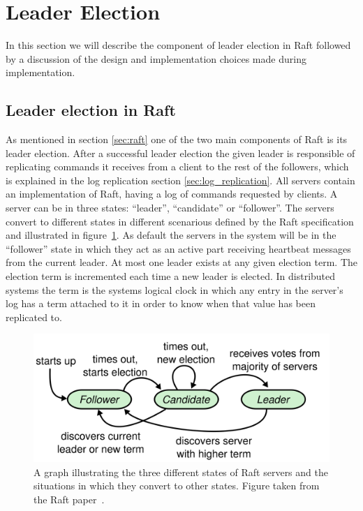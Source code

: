 \section{Leader Election} %
\label{sec:leader_election}
In this section we will describe the component of leader election in Raft followed by a discussion of the design and implementation choices made during implementation.

\subsection{Leader election in Raft}
As mentioned in section \ref{sec:raft} one of the two main components of Raft is its leader election. After a successful leader election the given leader is responsible of replicating commands it receives from a client to the rest of the followers, which is explained in the log replication section \ref{sec:log_replication}. All servers contain an implementation of Raft, having a log of commands requested by clients. A server can be in three states: ``leader'', ``candidate'' or ``follower''. The servers convert to different states in different scenarious defined by the Raft specification and illustrated in figure~\ref{fig:state_state_machine}. As default the servers in the system will be in the ``follower'' state in which they act as an active part receiving heartbeat messages from the current leader. At most one leader exists at any given election term. The election term is incremented each time a new leader is elected. In distributed systems the term is the systems logical clock in which any entry in the server's log has a term attached to it in order to know when that value has been replicated to.

\begin{figure}[ht!]
\centering
\includegraphics[width=0.6\linewidth]{figures/server_state_machine.png}
\caption{A graph illustrating the three different states of Raft servers and the situations in which they convert to other states. Figure taken from the Raft paper~\cite{Raft}.}
\label{fig:state_state_machine}
\end{figure}

